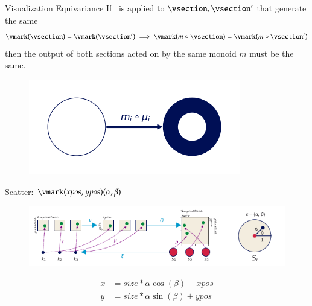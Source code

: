 \documentclass[xcolor={dvipsnames}, handout]{beamer}
\begin{document}
\begin{frame}{Visualization Equivariance}
    If \vmark\ is applied to $\vsection, \vsection^{\prime}$ that generate the same \gsection\, 
    \begin{equation}
    \vmark(\vsection) = \vmark(\vsection^{\prime})\implies \vmark(m\circ\vsection) = \vmark(m\circ\vsection^{\prime})
    \end{equation}
    then the output of both sections acted on by the same monoid $m$ must be the same. 
    \pause
    \begin{figure}[H]
        \includegraphics[width=\textwidth]{figures/math/diff_type_q.png}
    \end{figure}
\end{frame}

\begin{frame}{Scatter: $\vmark(xpos, ypos)(\alpha, \beta)$}
    \begin{figure}[H]
        \includegraphics[width=1\textwidth]{figures/math/scatter.png}
    \end{figure}
    
    \begin{align*}
        x &= size *\alpha \cos(\beta) + xpos \\
        y &= size *\alpha \sin(\beta) + ypos
    \end{align*}    
\end{frame}
\end{document}

